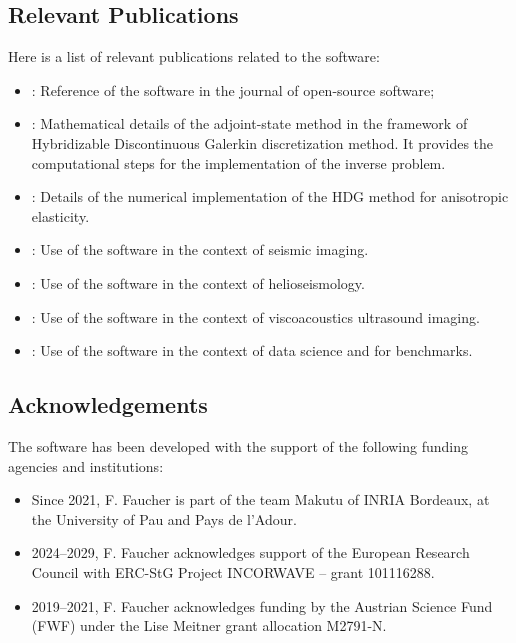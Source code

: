 \subsection{Relevant Publications}
\label{sec:Hawen:publications}

Here is a list of relevant publications related to the software:
\begin{itemize}
\item \cite{Hawen2021}: Reference of the software in the journal of open-source software;
\item \cite{Faucher2020adjoint}:
      Mathematical details of the adjoint-state method in the framework 
      of Hybridizable Discontinuous Galerkin discretization method.
      It provides the computational steps for the implementation of the 
      inverse problem.
\item \cite{Pham2024stabilization}: Details of the numerical implementation 
      of the HDG method for anisotropic elasticity.
\item \cite{Faucher2019FRgWIGeo,Faucher2020DAS}: 
      Use of the software in the context of seismic imaging.
\item \cite{Pham2020Siam,Pham2024assembling}:
      Use of the software in the context of helioseismology.
\item \cite{Faucher2023viscoacoustic}: 
      Use of the software in the context of viscoacoustics ultrasound imaging.
\item \cite{Liu2024,Benitez2024}: 
      Use of the software in the context of data science and
      for benchmarks.
\end{itemize}


\subsection{Acknowledgements}
\label{sec::Hawen:acknowledgements}

The software has been developed with the support of the following funding agencies and institutions: 

\begin{itemize}
  \item Since 2021, F. Faucher is part of the team Makutu of INRIA Bordeaux, at the 
                    University of Pau and Pays de l'Adour.
  \item 2024--2029, F. Faucher acknowledges support of the European Research Council 
                    with ERC-StG Project INCORWAVE -- grant 101116288.
  \item 2019--2021, F. Faucher acknowledges funding by the Austrian Science Fund (FWF) 
        under the Lise Meitner grant allocation M2791-N.
\end{itemize}



